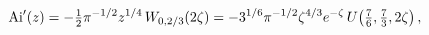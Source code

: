 \[\mathop{\mathrm{Ai}\/}\nolimits'\!\left(z\right)=-\tfrac{1}{2}\pi^{-1/2}z^{1/4%
}\mathop{W_{0,2/3}\/}\nolimits\!\left(2\zeta\right)=-3^{1/6}\pi^{-1/2}\zeta^{4%
/3}e^{-\zeta}\mathop{U\/}\nolimits\!\left(\tfrac{7}{6},\tfrac{7}{3},2\zeta%
\right),\]
